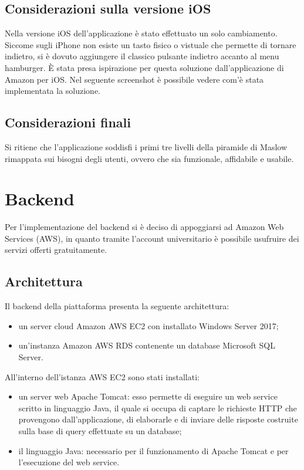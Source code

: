 \documentclass[12pt, a4paper, titlepage]{report}
\begin{document}
	\subsection{Considerazioni sulla versione iOS}
	
	Nella versione iOS dell'applicazione è stato effettuato un solo cambiamento. Siccome sugli iPhone non esiste un tasto fisico o vistuale che permette di tornare indietro, si è dovuto aggiungere il classico pulsante indietro accanto al menu hamburger. È stata presa ispirazione per questa soluzione dall'applicazione di Amazon per iOS. Nel seguente screenshot è possibile vedere com'è stata implementata la soluzione.
	
	\subsection{Considerazioni finali}
	Si ritiene che l'applicazione soddisfi i primi tre livelli della piramide di Maslow rimappata sui bisogni degli utenti, ovvero che sia funzionale, affidabile e usabile.
	
	\section{Backend}
	Per l'implementazione del backend si è deciso di appoggiarsi ad Amazon Web Services (AWS), in quanto tramite l'account universitario è possibile usufruire dei servizi offerti gratuitamente.
	\subsection{Architettura}
	Il backend della piattaforma presenta la seguente architettura:
	\begin{itemize}
		\item un server cloud Amazon AWS EC2 con installato Windows Server 2017;
		\item un'instanza Amazon AWS RDS contenente un database Microsoft SQL Server.
	\end{itemize}
	All'interno dell'istanza AWS EC2 sono stati installati:
	\begin{itemize}
		\item un server web Apache Tomcat: esso permette di eseguire un web service scritto in linguaggio Java, il quale si occupa di captare le richieste HTTP che provengono dall'applicazione, di elaborarle e di inviare delle risposte costruite sulla base di query effettuate su un database;
		\item il linguaggio Java: necessario per il funzionamento di Apache Tomcat e per l'esecuzione del web service.
	\end{itemize}
\end{document}
